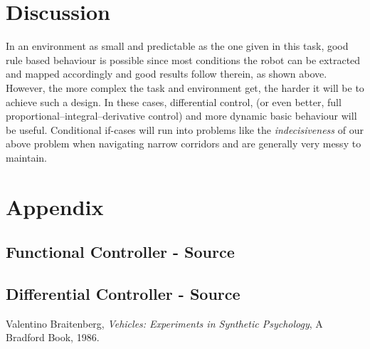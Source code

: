 \documentclass[paper=a4, fontsize=12pt]{scrartcl}	%
\numberwithin{equation}{section}		%
\numberwithin{figure}{section}			%
\numberwithin{table}{section}				%
\begin{document}
\section{Discussion}
In an environment as small and predictable as the one given in this task, good rule based behaviour is possible since most conditions the robot can be extracted and mapped accordingly and good results follow therein, as shown above. However, the more complex the task and environment get, the harder it will be to achieve such a design. In these cases, differential control, (or even better, full proportional–integral–derivative control) and more dynamic basic behaviour will be useful. Conditional if-cases will run into problems like the \emph{indecisiveness} of our above problem when navigating narrow corridors and are generally very messy to maintain.
\section{Appendix}
\subsection{Functional Controller - Source}

\subsection{Differential Controller - Source}

\begin{thebibliography}{9}
  Valentino Braitenberg,
  \emph{Vehicles: Experiments in Synthetic Psychology},
  A Bradford Book,
  1986.
\end{thebibliography}

\end{document}
